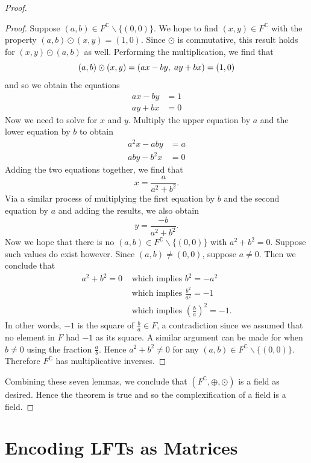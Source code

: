 \documentclass[12pt]{article}
\newcommand{\C}{\mathbb{C}}
\newcommand{\ttc}{, \hspace{1mm}}
\theoremstyle{plain}
\theoremstyle{definition}
\begin{document}
\begin{appendices}
\begin{proof}
\begin{proof}
Suppose $(a,b)\in F^\C\backslash\{(0,0)\}$. We hope to find $(x,y)\in F^\C$ with the property $(a,b)\odot(x,y) = (1,0)$. Since $\odot$ is commutative, this result holds for $(x,y)\odot(a,b)$ as well. Performing the multiplication, we find that
	\[
		(a,b)\odot(x,y) = (ax - by\ttc ay + bx) = (1,0)
	\]
	and so we obtain the equations
	\begin{align*}
		ax - by & = 1\\
		ay + bx & = 0
	\end{align*}
	Now we need to solve for $x$ and $y$. Multiply the upper equation by $a$ and the lower equation by $b$ to obtain
	\begin{align*}
		a^2x - aby & = a\\
		aby - b^2x & = 0
	\end{align*}
	Adding the two equations together, we find that
	\[
		x = \frac{a}{a^2 + b^2}.
	\]
	Via a similar process of multiplying the first equation by $b$ and the second equation by $a$ and adding the results, we also obtain
	\[
		y = \frac{-b}{a^2 + b^2}.
	\]
	Now we hope that there is no $(a,b)\in F^\C\backslash\{(0,0)\}$ with $a^2 + b^2 = 0$. Suppose such values do exist however. Since $(a,b)\neq (0,0)$, suppose $a\neq 0$. Then we conclude that
	\begin{align*}
		a^2 + b^2 = 0 & \text{ which implies } b^2 = -a^2\\
		& \text{ which implies } \frac{b^2}{a^2} = -1\\
		& \text{ which implies } \left(\frac{b}{a}\right)^2 = -1.
	\end{align*}
 	In other words, $-1$ is the square of $\frac{b}{a}\in F$, a contradiction since we assumed that no element in $F$ had $-1$ as its square. A similar argument can be made for when $b \neq 0$ using the fraction $\frac{a}{b}$. Hence $a^2 + b^2 \neq 0$ for any $(a,b)\in F^\C\backslash\{(0,0)\}$. Therefore $F^\C$ has multiplicative inverses.
\end{proof} 	
 	
Combining these seven lemmas, we conclude that $(F^\C,\oplus,\odot)$ is a field as desired. Hence the theorem is true and so the complexification of a field is a field. 

\end{proof}



\newpage 
\section{Encoding LFTs as Matrices} \label{appendixC}


\end{appendices}
\end{document}

